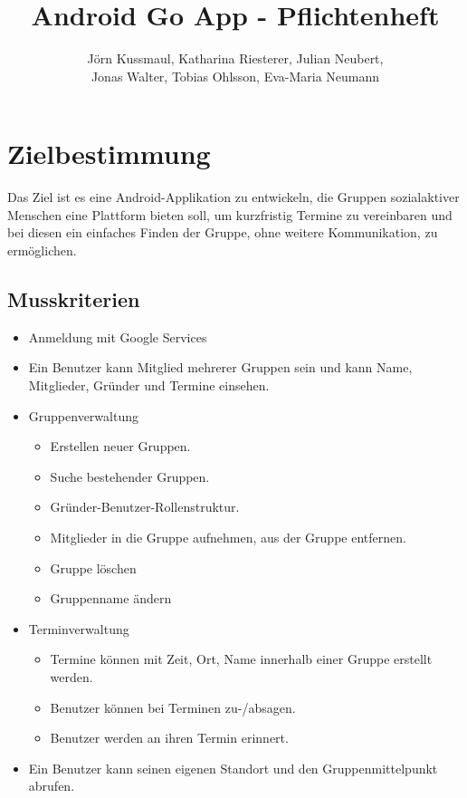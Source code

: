 \documentclass{scrartcl}
\title{Android Go App - Pflichtenheft}
\author{Jörn Kussmaul, Katharina Riesterer, Julian Neubert,\\ Jonas Walter, Tobias Ohlsson, Eva-Maria Neumann}
\begin{document}
		
	

	\maketitle
	\newpage
	
	\tableofcontents
	\newpage
	\section{Zielbestimmung}
	Das Ziel ist es eine Android-Applikation zu entwickeln, die Gruppen sozialaktiver Menschen eine Plattform bieten soll, um kurzfristig Termine zu vereinbaren und bei diesen ein einfaches Finden der Gruppe, ohne weitere Kommunikation, zu ermöglichen.
	\subsection{Musskriterien}
	\begin{itemize}
		\item Anmeldung mit Google Services
		\item Ein Benutzer kann \gls{Mitglied} mehrerer Gruppen sein und kann Name, Mitglieder, Gründer und Termine einsehen.
		\item Gruppenverwaltung
		\begin{itemize}
			\item Erstellen neuer Gruppen.
			\item Suche bestehender Gruppen.
			\item Gründer-Benutzer-Rollenstruktur.
			\item Mitglieder in die Gruppe aufnehmen, aus der Gruppe entfernen.
			\item Gruppe löschen
			\item Gruppenname ändern
		\end{itemize}
		\item Terminverwaltung
		\begin{itemize}
			\item Termine können mit Zeit, Ort, Name innerhalb einer Gruppe erstellt werden.
			\item Benutzer können bei Terminen zu-/absagen.
			\item Benutzer werden an ihren Termin erinnert.
		\end{itemize}
		\item Ein Benutzer kann seinen eigenen Standort und den Gruppenmittelpunkt abrufen.	
	\end{itemize}
\end{document}

